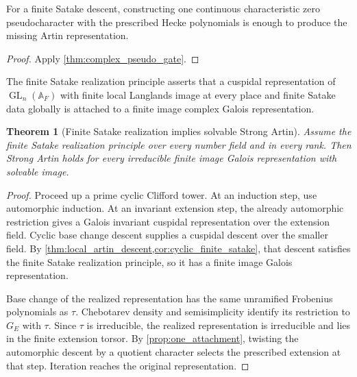 \documentclass{aomart}
\newtheorem{theorem}{Theorem}[section]
\theoremstyle{definition}
\theoremstyle{remark}
\newcommand{\Adele}{\mathbb A}
\newcommand{\GL}{\operatorname{GL}}
\begin{document}
\begin{corollary}\label{cor:pseudo_bottleneck}
For a finite Satake descent, constructing one continuous characteristic zero pseudocharacter with the prescribed Hecke polynomials is enough to produce the missing Artin representation.
\end{corollary}

\begin{proof}
Apply \cref{thm:complex_pseudo_gate}.
\end{proof}

\begin{definition}\label{def:finite_satake_principle}
The finite Satake realization principle asserts that a cuspidal representation of \(\GL_n(\Adele_F)\) with finite local Langlands image at every place and finite Satake data globally is attached to a finite image complex Galois representation.
\end{definition}

\begin{theorem}[Finite Satake realization implies solvable Strong Artin]\label{thm:FS_implies_solvable_artin}
Assume the finite Satake realization principle over every number field and in every rank. Then Strong Artin holds for every irreducible finite image Galois representation with solvable image.
\end{theorem}

\begin{proof}
Proceed up a prime cyclic Clifford tower. At an induction step, use automorphic induction. At an invariant extension step, the already automorphic restriction gives a Galois invariant cuspidal representation over the extension field. Cyclic base change descent supplies a cuspidal descent over the smaller field. By \cref{thm:local_artin_descent,cor:cyclic_finite_satake}, that descent satisfies the finite Satake realization principle, so it has a finite image Galois representation.

Base change of the realized representation has the same unramified Frobenius polynomials as \(\tau\). Chebotarev density and semisimplicity identify its restriction to \(G_E\) with \(\tau\). Since \(\tau\) is irreducible, the realized representation is irreducible and lies in the finite extension torsor. By \cref{prop:one_attachment}, twisting the automorphic descent by a quotient character selects the prescribed extension at that step. Iteration reaches the original representation.
\end{proof}
\end{document}
